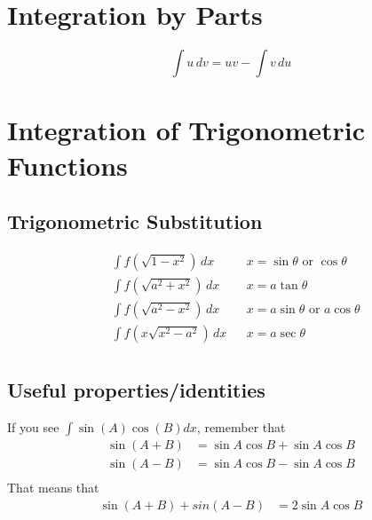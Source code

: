 \documentclass{article}
\begin{document}
\section{Integration by Parts}

\begin{equation*}
    \int u \, dv = uv - \int v \, du
\end{equation*}

\section{Integration of Trigonometric Functions}

\subsection*{Trigonometric Substitution}

\begin{align*}
   &\int f(\sqrt{1-x^2}) \,dx && x = \sin\theta \text{ or } \cos\theta \\
   &\int f(\sqrt{a^2+x^2}) \,dx && x = a\tan\theta \\
   &\int f(\sqrt{a^2-x^2}) \,dx && x = a\sin\theta \text{ or } a\cos\theta \\
   &\int f(x\sqrt{x^2-a^2}) \,dx && x = a\sec\theta \\
\end{align*}

\subsection*{Useful properties/identities}
If you see $\int \sin(A)\cos(B) dx$, remember that
\begin{align*}
    \sin(A+B) &= \sin A\cos B + \sin A\cos B \\
    \sin(A-B) &= \sin A\cos B - \sin A\cos B \\
\end{align*}
That means that
\begin{align*}
    \sin(A+B) + sin(A-B) &= 2\sin A\cos B\\
\end{align*}
\end{document}
